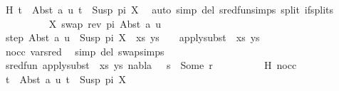 \begin{isabellebody}
\ H\ {\isacartoucheopen}t{}\ {\isacharequal}{\kern0pt}\ Abst\ a\ u{\isacartoucheclose}\ {\isacartoucheopen}t{}\ {\isacharequal}{\kern0pt}\ Susp\ pi\ X{\isacartoucheclose}\ \isamarkupfalse%
\ {\isacharparenleft}{\kern0pt}auto\ simp\ del{\isacharcolon}{\kern0pt}\ sred{\isacharunderscore}{\kern0pt}fun{\isachardot}{\kern0pt}simps\ split{\isacharcolon}{\kern0pt}\ if{\isacharunderscore}{\kern0pt}splits{\isacharparenright}{\kern0pt}\isanewline
\ \ \ \ \ \ \isamarkupfalse%
\ {\isacharquery}{\kern0pt}{\isasymsigma}\ {\isacharequal}{\kern0pt}\ {\isachardoublequoteopen}{\isacharbrackleft}{\kern0pt}{\isacharparenleft}{\kern0pt}X{\isacharcomma}{\kern0pt}\ swap\ {\isacharparenleft}{\kern0pt}rev\ pi{\isacharparenright}{\kern0pt}\ {\isacharparenleft}{\kern0pt}Abst\ a\ u{\isacharparenright}{\kern0pt}{\isacharparenright}{\kern0pt}{\isacharbrackright}{\kern0pt}{\isachardoublequoteclose}\isanewline
\ \ \ \ \ \ \isamarkupfalse%
\ step{\isacharcolon}{\kern0pt}\ {\isachardoublequoteopen}{\isacharparenleft}{\kern0pt}{\isacharparenleft}{\kern0pt}Abst\ a\ u\ {\isasymapprox}{\isacharquery}{\kern0pt}\ Susp\ pi\ X{\isacharparenright}{\kern0pt}\ {\isacharhash}{\kern0pt}\ xs{\isacharcomma}{\kern0pt}\ ys{\isacharparenright}{\kern0pt}\ {\isasymturnstile}\ {\isacharquery}{\kern0pt}{\isasymsigma}\ {\isasymleadsto}\ apply{\isacharunderscore}{\kern0pt}subst\ {\isacharquery}{\kern0pt}{\isasymsigma}\ {\isacharparenleft}{\kern0pt}xs{\isacharcomma}{\kern0pt}\ ys{\isacharparenright}{\kern0pt}{\isachardoublequoteclose}\isanewline
\ \ \ \ \ \ \ \ \isamarkupfalse%
\ nocc\ var{\isacharunderscore}{\kern0pt}{}{\isacharunderscore}{\kern0pt}sred\ \isamarkupfalse%
\ {\isacharparenleft}{\kern0pt}simp\ del{\isacharcolon}{\kern0pt}\ swap{\isachardot}{\kern0pt}simps{\isacharparenright}{\kern0pt}\isanewline
\ \ \ \ \ \ \isamarkupfalse%
\ {\isachardoublequoteopen}sred{\isacharunderscore}{\kern0pt}fun\ {\isacharparenleft}{\kern0pt}apply{\isacharunderscore}{\kern0pt}subst\ {\isacharquery}{\kern0pt}{\isasymsigma}\ {\isacharparenleft}{\kern0pt}xs{\isacharcomma}{\kern0pt}\ ys{\isacharparenright}{\kern0pt}{\isacharcomma}{\kern0pt}\ nabla{\isacharcomma}{\kern0pt}\ {\isacharquery}{\kern0pt}{\isasymsigma}\ {\isasymbullet}\ s{\isacharparenright}{\kern0pt}\ {\isacharequal}{\kern0pt}\ Some\ r{\isachardoublequoteclose}\isanewline
\ \ \ \ \ \ \ \ \isamarkupfalse%
\ H\ nocc\ \isamarkupfalse%
\ {\isacartoucheopen}t{}\ {\isacharequal}{\kern0pt}\ Abst\ a\ u{\isacartoucheclose}\ {\isacartoucheopen}t{}\ {\isacharequal}{\kern0pt}\ Susp\ pi\ X{\isacartoucheclose}\ \isamarkupfalse%

\end{isabellebody}
